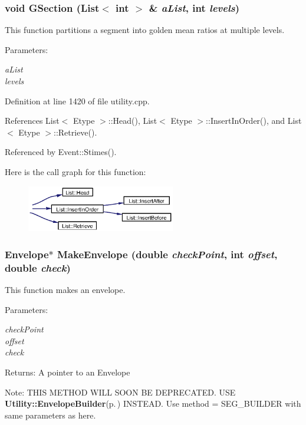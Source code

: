 \subsubsection{\setlength{\rightskip}{0pt plus 5cm}void GSection ({\bf List}$<$ int $>$ \& {\em a\-List}, int {\em levels})}\label{utility_8h_a31}


This function partitions a segment into golden mean ratios at multiple levels. \begin{Desc}
\item[Parameters:]
\begin{description}
\item[{\em a\-List}]\item[{\em levels}]\end{description}
\end{Desc}


Definition at line 1420 of file utility.cpp.

References List$<$ Etype $>$::Head(), List$<$ Etype $>$::Insert\-In\-Order(), and List$<$ Etype $>$::Retrieve().

Referenced by Event::Stimes().

Here is the call graph for this function:\begin{figure}[H]
\begin{center}
\leavevmode
\includegraphics[width=184pt]{utility_8h_a31_cgraph}
\end{center}
\end{figure}
\subsubsection{\setlength{\rightskip}{0pt plus 5cm}Envelope$\ast$ Make\-Envelope (double {\em check\-Point}, int {\em offset}, double {\em check})}\label{utility_8h_a23}


This function makes an envelope. \begin{Desc}
\item[Parameters:]
\begin{description}
\item[{\em check\-Point}]\item[{\em offset}]\item[{\em check}]\end{description}
\end{Desc}
\begin{Desc}
\item[Returns:]A pointer to an Envelope \end{Desc}
\begin{Desc}
\item[Note:]THIS METHOD WILL SOON BE DEPRECATED. USE {\bf Utility::Envelope\-Builder}{\rm (p.\,\pageref{utility_8h_a19})} INSTEAD. Use method = SEG\_\-BUILDER with same parameters as here. \end{Desc}
